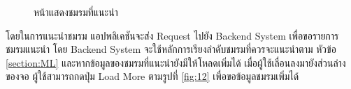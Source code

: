 \documentclass[14pt,oneside,openright,a4paper]{cpe-thai-project}
\begin{document}
\begin{figure}[H]\centering
  \setlength{\fboxrule}{0.5mm}
  \setlength{\fboxsep}{0.5cm}
  \caption{หน้าแสดงชมรมที่แนะนำ}\label{fig:10}
\end{figure}

โดยในการแนะนำชมรม แอปพลิเคชันจะส่ง Request ไปยัง Backend System เพื่อขอรายการชมรมแนะนำ โดย Backend System จะใช้หลักการเรียงลำดับชมรมที่ควรจะแนะนำตาม
หัวข้อ \ref{section:ML}  และหากข้อมูลของชมรมที่แนะนํายังมีให้โหลดเพิ่มได้ เมื่อผู้ใช้เลื่อนลงมายังส่วนล่างของจอ ผู้ใช้สามารถกดปุ่ม Load More ตามรูปที่ \ref{fig:12} เพื่อขอข้อมูลชมรมเพิ่มได้
\end{document}

